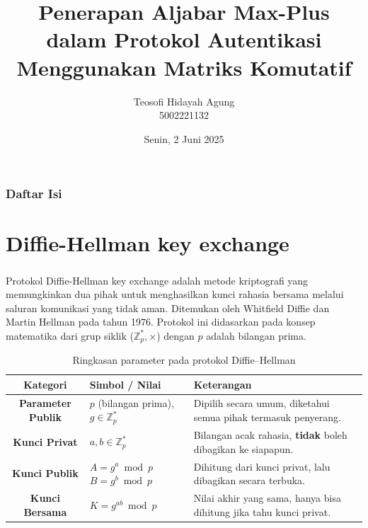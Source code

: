 \documentclass[aspectratio=169]{beamer}
\date{Senin, 2 Juni 2025}
\title[Aljabar Max-Plus]{Penerapan Aljabar Max-Plus dalam Protokol Autentikasi Menggunakan Matriks Komutatif}
\author[Tetew]{Teosofi Hidayah Agung \\ 5002221132}
\institute[Matematika ITS]{Departemen Matematika\\ Institut Teknologi Sepuluh Nopember}
\theoremstyle{definition}
\numberwithin{definisi}{section}
\newcommand{\Z}{\mathbb{Z}}
\begin{document}
\begin{frame}
  \titlepage
\end{frame}

\begin{frame}
  \frametitle{Daftar Isi}
  \tableofcontents
\end{frame}

\section{Diffie-Hellman key exchange}
\begin{frame}
  \frametitle{\insertsection}
  Protokol Diffie-Hellman key exchange adalah metode kriptografi yang memungkinkan dua pihak untuk menghasilkan kunci rahasia bersama melalui saluran komunikasi yang tidak aman. Ditemukan oleh Whitfield Diffie dan Martin Hellman pada tahun 1976. Protokol ini didasarkan pada konsep matematika dari grup siklik ($\Z_p^*,\times$) dengan $p$ adalah bilangan prima.
    {\small\begin{table}[h]
        \centering
        \begin{tabular}{|c|m{3cm}|m{5cm}|}
          \hline
          \rowcolor{lightgray}\textbf{Kategori}       & \textbf{Simbol / Nilai} & \textbf{Keterangan} \\ \hline
          \textbf{Parameter Publik}                   &
          $p$ (bilangan prima), $g\in \Z_p^*$         &
          Dipilih secara umum, diketahui semua pihak termasuk penyerang.                              \\ \hline

          \textbf{Kunci Privat}                       &
          $a,b\in \Z_p^*$                             &
          Bilangan acak rahasia, \textbf{tidak} boleh dibagikan ke siapapun.                          \\ \hline

          \textbf{Kunci Publik}                       &
          $A = g^a \bmod p$\newline $B = g^b \bmod p$ &
          Dihitung dari kunci privat, lalu dibagikan secara terbuka.                                  \\ \hline

          \textbf{Kunci Bersama}                      &
          $K = g^{ab} \bmod p$                        &
          Nilai akhir yang sama, hanya bisa dihitung jika tahu kunci privat.                          \\ \hline
        \end{tabular}
        \caption{Ringkasan parameter pada protokol Diffie--Hellman}
      \end{table}}
\end{frame}
\end{document}
